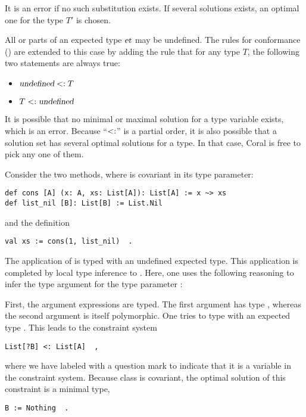 It is an error if no such substitution exists. If several solutions exists, an optimal one for the type $T'$ is chosen. 

All or parts of an expected type $\mbox{\sl et}$ may be undefined. The rules for conformance () are extended to this case by adding the rule that for any type $T$, the following two statements are always true:
\begin{itemize}
\item $\mbox{\sl undefined} <: T$
\item $T <: \mbox{\sl undefined}$
\end{itemize}

It is possible that no minimal or maximal solution for a type variable exists, which is an error. Because ``$<:$'' is a partial order, it is also possible that a solution set has several optimal solutions for a type. In that case, Coral is free to pick any one of them. 

\example Consider the two methods, where  is covariant in its type parameter:
\begin{lstlisting}
def cons [A] (x: A, xs: List[A]): List[A] := x ~> xs
def list_nil [B]: List[B] := List.Nil
\end{lstlisting}
and the definition
\begin{lstlisting}
val xs := cons(1, list_nil)  .
\end{lstlisting}

The application of  is typed with an undefined expected type. This application is completed by local type inference to . Here, one uses the following reasoning to infer the type argument  for the type parameter :

First, the argument expressions are typed. The first argument  has type , whereas the second argument  is itself polymorphic. One tries to type  with an expected type . This leads to the constraint system
\begin{lstlisting}
List[?B] <: List[A]  ,
\end{lstlisting}
where we have labeled  with a question mark to indicate that it is a variable in the constraint system. Because class  is covariant, the optimal solution of this constraint is a minimal type, 
\begin{lstlisting}
B := Nothing  .
\end{lstlisting}

